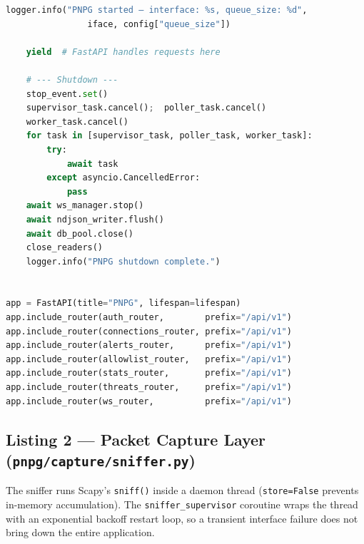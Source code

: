\documentclass[12pt]{article}
\begin{document}
\begin{lstlisting}[language=Python, caption={Application lifespan — startup and shutdown sequence}]
    logger.info("PNPG started — interface: %s, queue_size: %d",
                iface, config["queue_size"])

    yield  # FastAPI handles requests here

    # --- Shutdown ---
    stop_event.set()
    supervisor_task.cancel();  poller_task.cancel()
    worker_task.cancel()
    for task in [supervisor_task, poller_task, worker_task]:
        try:
            await task
        except asyncio.CancelledError:
            pass
    await ws_manager.stop()
    await ndjson_writer.flush()
    await db_pool.close()
    close_readers()
    logger.info("PNPG shutdown complete.")


app = FastAPI(title="PNPG", lifespan=lifespan)
app.include_router(auth_router,        prefix="/api/v1")
app.include_router(connections_router, prefix="/api/v1")
app.include_router(alerts_router,      prefix="/api/v1")
app.include_router(allowlist_router,   prefix="/api/v1")
app.include_router(stats_router,       prefix="/api/v1")
app.include_router(threats_router,     prefix="/api/v1")
app.include_router(ws_router,          prefix="/api/v1")
\end{lstlisting}

\subsection*{Listing 2 --- Packet Capture Layer (\texttt{pnpg/capture/sniffer.py})}

The sniffer runs Scapy's \texttt{sniff()} inside a daemon thread
(\texttt{store=False} prevents in-memory accumulation). The
\texttt{sniffer\_supervisor} coroutine wraps the thread with an exponential
backoff restart loop, so a transient interface failure does not bring down the
entire application.
\end{document}
